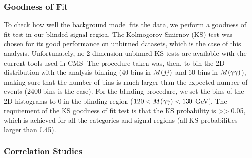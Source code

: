 \subsubsection{Goodness of Fit}

To check how well the background model fits the data, we perform a goodness of fit test in our blinded signal region.
The Kolmogorov-Smirnov (KS) test was chosen for its good performance on unbinned datasets, which is the case of this analysis.
Unfortunately, no 2-dimension unbinned KS tests are available with the current tools used in CMS.
The procedure taken was, then, to bin the 2D distribution with the analysis binning (40 bins in $M(jj)$ and 60 bins in $M(\gamma\gamma)$), making sure that the number of bins is much larger than the expected number of events (2400 bins is the case).
For the blinding procedure, we set the bins of the 2D histograms to 0 in the blinding region ($120 < M(\gamma\gamma) < 130$ GeV).
The requirement of the KS goodness of fit test is that the KS probability is >> 0.05, which is achieved for all the categories and signal regions (all KS probabilities larger than 0.45).

\subsubsection{Correlation Studies}

